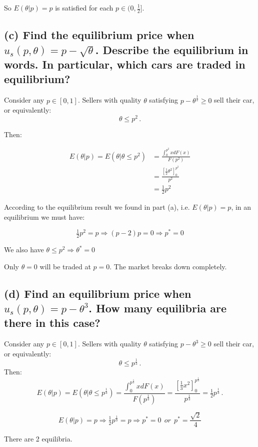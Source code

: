 \documentclass{article}
\begin{document}
So $E(\theta | p) = p$ is satisfied for each $p \in (0,\tfrac12]$.

\subsection*{(c) Find the equilibrium price when $u_s(p, \theta) = p - \sqrt{\theta}$. Describe the equilibrium in words. In
particular, which cars are traded in equilibrium?}

Consider any $p \in [0,1]$. Sellers with quality $\theta$ satisfying $p - \theta^\frac12 \geq 0$ sell their car, or equivalently:$$\theta \leq p^2 \, .$$

Then:

\begin{align*}
E(\theta | p) = E(\theta | \theta \leq p^2) &= \frac{\int_{0}^{p^2}x dF(x)}{F(p^2)} \\
&= \frac{\left[ \tfrac12 \theta^2 \right]^{p^2}_0}{p^2} \\
&= \tfrac12 p^2
\end{align*}

According to the equilibrium result we found in part (a), i.e.
$E(\theta | p) = p$, in an equilibrium we must have:

$$\tfrac12 p^2 = p \Rightarrow (p-2)p = 0 \Rightarrow p^* = 0$$ 

We also have $\theta \leq p^2 \Rightarrow \theta^* = 0$

\medskip

Only $\theta = 0$ will be traded at $p=0$. The market breaks down completely.

\subsection*{(d) Find an equilibrium price when $u_s(p, \theta) = p - \theta^3$. How many equilibria are there in this case?  }

Consider any $p \in [0,1]$. Sellers with quality $\theta$ satisfying $p - \theta^3 \geq 0$ sell their car, or equivalently:$$\theta \leq p^{\tfrac13} \, .$$
Then:
$$E(\theta | p) = E(\theta | \theta \leq p^{\tfrac13})= \frac{\int_{0}^{p^{\frac13}}x dF(x)}{F(p^{\frac13})} = \frac{\left[ \tfrac13 x^2 \right]^{p^{\frac13}}_0}{p^{\frac13}} = \tfrac12 p^{\frac13} \, .$$

$$E(\theta | p) = p \Rightarrow \tfrac12 p^{\frac13} = p \Rightarrow p^*=0 \ \ or \ \ p^*= \frac{\sqrt{2}}{4}$$

There are 2 equilibria.
\end{document}
